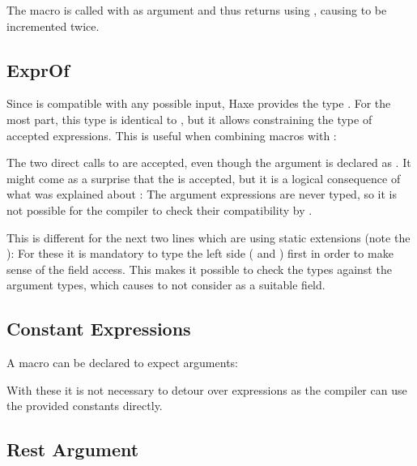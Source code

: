 \documentclass{haxe}
\begin{document}

The macro  is called with  as argument and thus returns  using , causing  to be incremented twice.

\subsection{ExprOf}
\label{macro-ExprOf}

Since  is compatible with any possible input, Haxe provides the type . For the most part, this type is identical to , but it allows constraining the type of accepted expressions. This is useful when combining macros with :


The two direct calls to  are accepted, even though the argument is declared as . It might come as a surprise that the   is accepted, but it is a logical consequence of what was explained about : The argument expressions are never typed, so it is not possible for the compiler to check their compatibility by .

This is different for the next two lines which are using static extensions (note the ): For these it is mandatory to type the left side ( and ) first in order to make sense of the  field access. This makes it possible to check the types against the argument types, which causes  to not consider  as a suitable field.

\subsection{Constant Expressions}
\label{macro-constant-arguments}

A macro can be declared to expect  arguments:


With these it is not necessary to detour over expressions as the compiler can use the provided constants directly.

\subsection{Rest Argument}
\label{macro-rest-argument}
\end{document}
